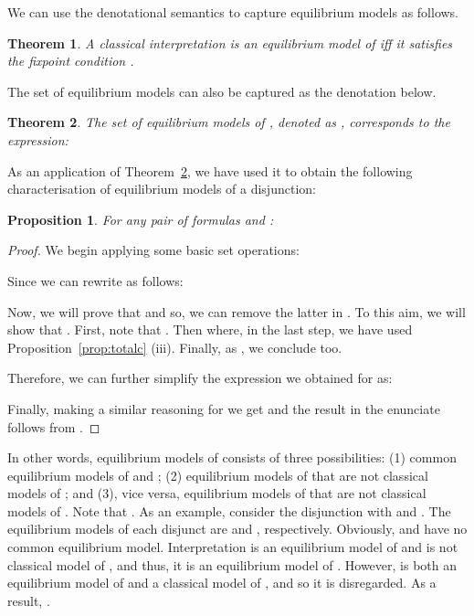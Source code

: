 \documentclass{tlp}
\def\qed{~\hfill}
\newtheorem{theorem}{Theorem}
\newtheorem{proposition}{Proposition}
\begin{document}
We can use the denotational semantics to capture equilibrium models as follows.
\begin{theorem}\label{th:1eq} 
A classical interpretation  is an equilibrium model of  iff it  satisfies the fixpoint condition .\qed
\end{theorem}

The set of equilibrium models can also be captured as the denotation below.
\begin{theorem}\label{th:eq} 
The set of equilibrium models of , denoted as , corresponds to the expression:

\end{theorem}

As an application of Theorem~\ref{th:eq}, we have used it to obtain the following characterisation of equilibrium models of a disjunction:

\begin{proposition}\label{prop:or}
For any pair of formulas  and :

\end{proposition}
\begin{proof}
We begin applying some basic set operations:

Since  we can rewrite  as follows:

Now, we will prove that  and so, we can remove the latter in . To this aim, we will show that . First, note that . Then  where, in the last step, we have used Proposition~\ref{prop:totalc} (iii). Finally, as , we conclude  too.

Therefore, we can further simplify the expression we obtained for  as:

Finally, making a similar reasoning for  we get  and the result in the enunciate follows from .
\end{proof}


\noindent In other words, equilibrium models of  consists of three possibilities: (1) common equilibrium models of  and ; (2) equilibrium models of  that are not classical models of ; and (3), vice versa, equilibrium models of  that are not classical models of . Note that . As an example, consider the disjunction  with  and . The equilibrium models of each disjunct are  and , respectively. Obviously,  and  have no common equilibrium model. Interpretation  is an equilibrium model of  and is not classical model of , and thus, it is an equilibrium model of . However,  is both an equilibrium model of  and a classical model of , and so it is disregarded. As a result, .
\end{document}
